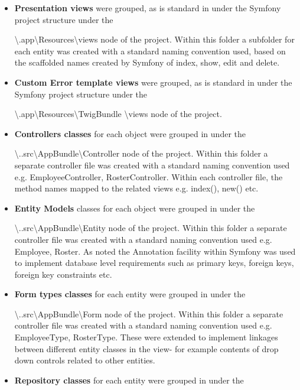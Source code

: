 \documentclass[a4paper,Times New Roman 11pt]{article}
\begin{document}
\begin {itemize}
\item \textbf{Presentation views} were grouped, as is standard in under the Symfony project structure under the 

\textbackslash.app\textbackslash Resources\textbackslash views node of the project. Within this folder a subfolder for each entity was created with a standard naming convention used, based on the scaffolded names created by Symfony of index, show, edit and delete.

\item \textbf{Custom Error template views} were grouped, as is standard in under the Symfony project structure under the 

\textbackslash.app\textbackslash Resources\textbackslash TwigBundle \textbackslash views node of the project. 

\item \textbf{Controllers classes} for each object were grouped in under the 

\textbackslash..src\textbackslash AppBundle\textbackslash Controller node of the project. Within this folder a separate controller file was created with a standard naming convention used e.g. EmployeeController, RosterController. Within each controller file, the method names mapped to the related views e.g. index(), new() etc.
\item \textbf{Entity Models} classes for each object were grouped in under the 

\textbackslash ..src\textbackslash AppBundle\textbackslash Entity node of the project. Within this folder a separate controller file was created with a standard naming convention used e.g. Employee, Roster. As noted the Annotation facility within Symfony was used to implement database level requirements such as primary keys, foreign keys, foreign key constraints etc.
\item \textbf{Form types classes} for each entity were grouped in under the 

\textbackslash ..src\textbackslash AppBundle\textbackslash Form node of the project. Within this folder a separate controller file was created with a standard naming convention used e.g. EmployeeType, RosterType. These were extended to implement linkages between different entity classes in the view- for example contents of drop down controls related to other entities.

\item \textbf{Repository classes} for each entity were grouped in under the 


\end{itemize}
\end{document}
